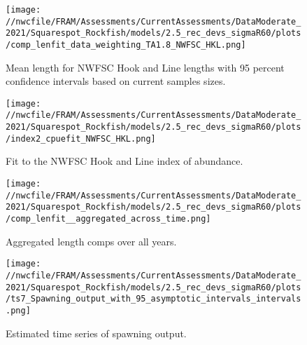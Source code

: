 \documentclass[11pt,
  english,
  a4paper,
]{article}
\begin{document}
\tagmcend\tagstructend


\begin{figure}
\centering
\texttt{[image: //nwcfile/FRAM/Assessments/CurrentAssessments/DataModerate\_2021/Squarespot\_Rockfish/models/2.5\_rec\_devs\_sigmaR60/plots/comp\_lenfit\_data\_weighting\_TA1.8\_NWFSC\_HKL.png]}
\caption{Mean length for NWFSC Hook and Line lengths with 95 percent confidence intervals based on current samples sizes.\label{fig:hkl-mean-len-fit}}
\end{figure}

\tagmcend\tagstructend


\begin{figure}
\centering
\texttt{[image: //nwcfile/FRAM/Assessments/CurrentAssessments/DataModerate\_2021/Squarespot\_Rockfish/models/2.5\_rec\_devs\_sigmaR60/plots/index2\_cpuefit\_NWFSC\_HKL.png]}
\caption{Fit to the NWFSC Hook and Line index of abundance.\label{fig:hkl-index-fit}}
\end{figure}

\tagmcend\tagstructend


\begin{figure}
\centering
\texttt{[image: //nwcfile/FRAM/Assessments/CurrentAssessments/DataModerate\_2021/Squarespot\_Rockfish/models/2.5\_rec\_devs\_sigmaR60/plots/comp\_lenfit\_\_aggregated\_across\_time.png]}
\caption{Aggregated length comps over all years.\label{fig:agg-len-fit}}
\end{figure}

\tagmcend\tagstructend


\begin{figure}
\centering
\texttt{[image: //nwcfile/FRAM/Assessments/CurrentAssessments/DataModerate\_2021/Squarespot\_Rockfish/models/2.5\_rec\_devs\_sigmaR60/plots/ts7\_Spawning\_output\_with\_95\_asymptotic\_intervals\_intervals.png]}
\caption{Estimated time series of spawning output.\label{fig:ssb}}
\end{figure}
\end{document}
